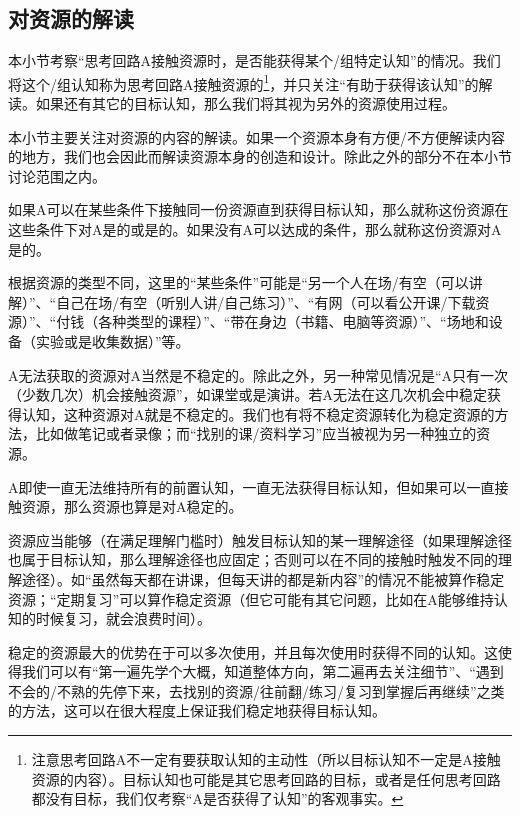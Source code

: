 \subsection{对资源的解读}
\begin{explain}
本小节考察“思考回路A接触资源时，是否能获得某个/组特定认知”的情况。我们将这个/组认知称为思考回路A接触资源的\footnote{注意思考回路A不一定有要获取认知的主动性（所以目标认知不一定是A接触资源的内容）。目标认知也可能是其它思考回路的目标，或者是任何思考回路都没有目标，我们仅考察“A是否获得了认知”的客观事实。}，并只关注“有助于获得该认知”的解读。如果还有其它的目标认知，那么我们将其视为另外的资源使用过程。

本小节主要关注对资源的内容的解读。如果一个资源本身有方便/不方便解读内容的地方，我们也会因此而解读资源本身的创造和设计。除此之外的部分不在本小节讨论范围之内。
\end{explain}
如果A可以在某些条件下接触同一份资源直到获得目标认知，那么就称这份资源在这些条件下对A是的或是的。如果没有A可以达成的条件，那么就称这份资源对A是的。
\begin{explain}
根据资源的类型不同，这里的“某些条件”可能是“另一个人在场/有空（可以讲解）”、“自己在场/有空（听别人讲/自己练习）”、“有网（可以看公开课/下载资源）”、“付钱（各种类型的课程）”、“带在身边（书籍、电脑等资源）”、“场地和设备（实验或是收集数据）”等。

A无法获取的资源对A当然是不稳定的。除此之外，另一种常见情况是“A只有一次（少数几次）机会接触资源”，如课堂或是演讲。若A无法在这几次机会中稳定获得认知，这种资源对A就是不稳定的。我们也有将不稳定资源转化为稳定资源的方法，比如做笔记或者录像；而“找别的课/资料学习”应当被视为另一种独立的资源。

A即使一直无法维持所有的前置认知，一直无法获得目标认知，但如果可以一直接触资源，那么资源也算是对A稳定的。

资源应当能够（在满足理解门槛时）触发目标认知的某一理解途径（如果理解途径也属于目标认知，那么理解途径也应固定；否则可以在不同的接触时触发不同的理解途径）。如“虽然每天都在讲课，但每天讲的都是新内容”的情况不能被算作稳定资源；“定期复习”可以算作稳定资源（但它可能有其它问题，比如在A能够维持认知的时候复习，就会浪费时间）。

稳定的资源最大的优势在于可以多次使用，并且每次使用时获得不同的认知。这使得我们可以有“第一遍先学个大概，知道整体方向，第二遍再去关注细节”、“遇到不会的/不熟的先停下来，去找别的资源/往前翻/练习/复习到掌握后再继续”之类的方法，这可以在很大程度上保证我们稳定地获得目标认知。
\end{explain}

